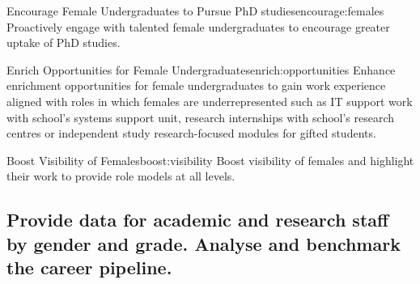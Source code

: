 \newcommand{\actencouragefemales}{Proactively engage with talented female undergraduates to encourage greater uptake of PhD studies.}
\begin{actionblock}{\ksspace{}Encourage Female Undergraduates to Pursue PhD studies}{encourage:females}
\actencouragefemales 
\hfill{
    \hypersetup{hidelinks}
    \hyperlink{b0}{\gotoactionsymbol{}}
}
\end{actionblock}


%
\newcommand{\actenrichopportunities}{Enhance enrichment opportunities for female undergraduates to gain work experience aligned with roles in which females are underrepresented such as IT support work  with school’s systems support unit, research internships with school’s research centres or independent study research-focused modules for gifted students.}
\begin{actionblock}{\ksspace{}Enrich Opportunities for Female Undergraduates}{enrich:opportunities}
\actenrichopportunities
\hfill{
    \hypersetup{hidelinks}
    \hyperlink{b0}{\gotoactionsymbol{}}
}
\end{actionblock}


\newcommand{\actboostvisibility}{Boost visibility of females  and highlight their work to provide role models at all levels.}
\begin{actionblock}{\ksspace{}Boost Visibility of Females}{boost:visibility}
\actboostvisibility
\hfill{
    \hypersetup{hidelinks}
    \hyperlink{b0}{\gotoactionsymbol{}}
}
\end{actionblock}



\subsection{Provide data for academic and research staff by gender and grade. Analyse and benchmark the career pipeline.}
\label{sec:academic_research}



